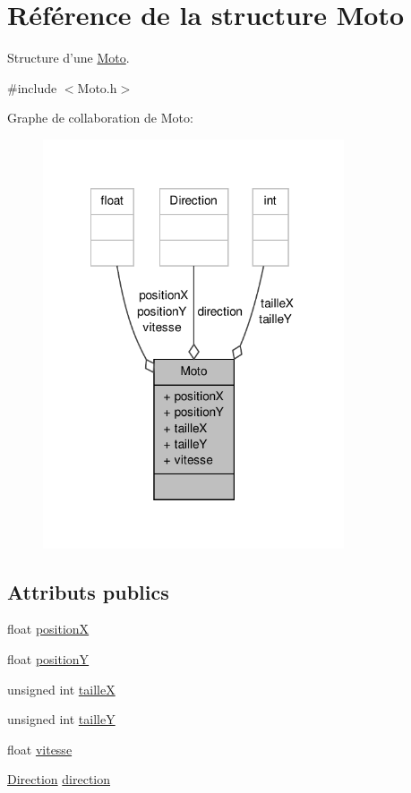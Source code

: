 \hypertarget{structMoto}{\section{Référence de la structure Moto}
\label{structMoto}
}


Structure d'une \hyperlink{structMoto}{Moto}.  




{\ttfamily \#include $<$Moto.\-h$>$}



Graphe de collaboration de Moto\-:\nopagebreak
\begin{figure}[H]
\begin{center}
\leavevmode
\includegraphics[width=252pt]{structMoto__coll__graph}
\end{center}
\end{figure}
\subsection*{Attributs publics}
\begin{DoxyCompactItemize}
\item 
float \hyperlink{structMoto_a7d9695eb69a7161d1a6800e4b8bc4170}{position\-X}
\item 
float \hyperlink{structMoto_a68859bbff76786aedccab8093a9de5a8}{position\-Y}
\item 
unsigned int \hyperlink{structMoto_a15d1b56209aba6ea0bc8eeaac82ae625}{taille\-X}
\item 
unsigned int \hyperlink{structMoto_ab7b358839b7d20f16a4a17e5eabad5a4}{taille\-Y}
\item 
float \hyperlink{structMoto_a561dfc3e54a534dfa92ccecbea8dbe71}{vitesse}
\item 
\hyperlink{Moto_8h_a224b9163917ac32fc95a60d8c1eec3aa}{Direction} \hyperlink{structMoto_ace42f991dc2d223029ca7f7162a10e9b}{direction}
\end{DoxyCompactItemize}


